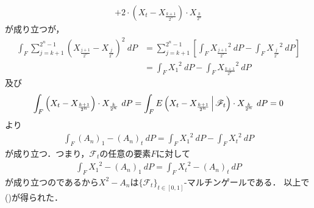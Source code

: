 \begin{sketch}
\begin{description}
\begin{align}
					+ 2 \cdot \left( X_{t} - X_{\frac{k+1}{2^{n}}} \right) \cdot X_{\frac{k}{2^{n}}}
				\end{align}
				が成り立つが，
				\begin{align}
					\int_{F} \sum_{j=k+1}^{2^{n}-1} \left( X_{\frac{j+1}{2^{n}}} - X_{\frac{j}{2^{n}}} \right)^{2}\ dP
					&= \sum_{j=k+1}^{2^{n}-1} \left[\int_{F} {X_{\frac{j+1}{2^{n}}}}^{2}\ dP
					- \int_{F} {X_{\frac{j}{2^{n}}}}^{2}\ dP\right] \\
					&= \int_{F} {X_{1}}^{2}\ dP - \int_{F} {X_{\frac{k+1}{2^{n}}}}^{2}\ dP
				\end{align}
				及び
				\begin{align}
					\int_{F} \left( X_{t} - X_{\frac{k+1}{2^{n}}} \right) \cdot X_{\frac{k}{2^{n}}}\ dP
					= \int_{F} E\left( X_{t} - X_{\frac{k+1}{2^{n}}} \, \middle|\, \mathscr{F}_{t} \right) \cdot X_{\frac{k}{2^{n}}}\ dP
					= 0
				\end{align}
				より
				\begin{align}
					\int_{F} (A_{n})_{1} - (A_{n})_{t}\ dP = \int_{F} {X_{1}}^{2}\ dP - \int_{F} {X_{t}}^{2}\ dP
				\end{align}
				が成り立つ．つまり，$\mathscr{F}_{t}$の任意の要素$F$に対して
				\begin{align}
					\int_{F} {X_{1}}^{2} - (A_{n})_{1}\ dP = \int_{F} {X_{t}}^{2} - (A_{n})_{t}\ dP
				\end{align}
				が成り立つのであるから$X^{2} - A_{n}$は$\{\mathscr{F}_{t}\}_{t \in [0,1]}$-マルチンゲールである．
				以上で()が得られた．
				

\end{description}
\end{sketch}
